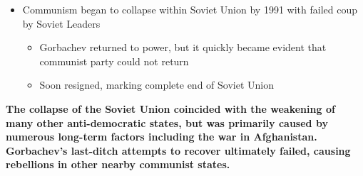 \documentclass[a4paper]{article}
\begin{document}
{\begin{itemize}
\begin{itemize}
\begin{itemize}
                    \end{itemize}
                    \item Government of South Africa began to withdraw from formally strict apartheid policies
                    \begin{itemize}
                        \item Legalized major black party, released Nelson Mandela -> Nelson Mandela quickly became first black president of South Africa
                    \end{itemize}
                \end{itemize}
                \item Communism began to collapse within Soviet Union by 1991 with failed coup by Soviet Leaders
                \begin{itemize}
                    \item Gorbachev returned to power, but it quickly became evident that communist party could not return
                    \item Soon resigned, marking complete end of Soviet Union
                \end{itemize}
            \end{itemize}
            \textbf{The collapse of the Soviet Union coincided with the weakening of many other anti-democratic states, but was primarily caused by numerous long-term factors including the war in Afghanistan. Gorbachev's last-ditch attempts to recover ultimately failed, causing rebellions in other nearby communist states.}
        }
\end{document}
